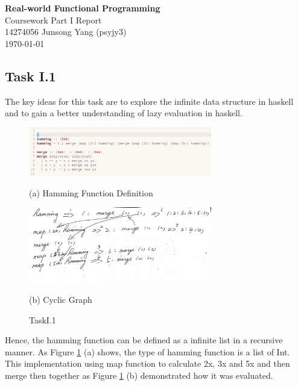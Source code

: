\documentclass{article}
\begin{document}
\begin{center}
  \LARGE{\textbf{Real-world Functional Programming}} \\
  \Large{Coursework Part I Report} \\
  \normalsize{14274056 Junsong Yang (psyjy3)} \\
  \today
\end{center}


\begin{normalsize}
  \section{Task I.1}
  The key ideas for this task are to explore the infinite data structure
  in haskell and to gain a better understanding of lazy evaluation in haskell.

  \begin{figure}[H]

    \begin{minipage}[b]{0.48\linewidth}
      \centering
      \centerline{\includegraphics[width=8.0cm]{Hamming}}
      \centerline{ (a) Hamming Function Definition}\medskip
    \end{minipage}
    \hfill
    \begin{minipage}[b]{0.48\linewidth}
      \centering
      \centerline{\includegraphics[width=8.0cm]{cyclic}}
      \centerline{ (b) Cyclic Graph}\medskip
    \end{minipage}
    \caption{TaskI.1}
    \label{fig:taskI.1}
  \end{figure}


  Hence, the hamming function can be defined as a infinite list in a recursive
  manner. As Figure \ref{fig:taskI.1} (a) shows, the type of hamming function is
  a list of Int. This implementation using map function to calculate 2x, 3x and
  5x and then merge then together as Figure \ref{fig:taskI.1} (b) demonstrated
  how it was evaluated.


\end{normalsize}
\end{document}
